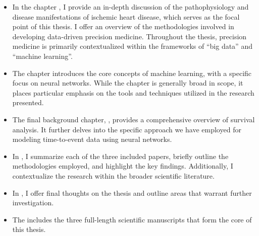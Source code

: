 \begin{itemize} 

    \item In the chapter , I provide an
        in-depth discussion of the pathophysiology and disease manifestations of
        ischemic heart disease, which serves as the focal point of this thesis.
        I offer an overview of the methodologies involved in developing data-driven
        precision medicine. Throughout the thesis, precision medicine is
        primarily contextualized within the frameworks of \enquote{big data} 
        and \enquote{machine learning}.

    \item The chapter  introduces the core concepts of
        machine learning, with a specific focus on neural networks. While the
        chapter is generally broad in scope, it places particular emphasis on
        the tools and techniques utilized in the research presented.

    \item The final background chapter, , provides a
        comprehensive overview of survival analysis. It further delves into the
        specific approach we have employed for modeling time-to-event data
        using neural networks.  

    \item In , I summarize each of the three included papers,
        briefly outline the methodologies employed, and highlight the key
        findings.  Additionally, I contextualize the research within the
        broader scientific literature.

    \item In , I offer final thoughts on the thesis and
        outline areas that warrant further investigation.

    \item The  includes the three full-length scientific
        manuscripts that form the core of this thesis.

\end{itemize}

